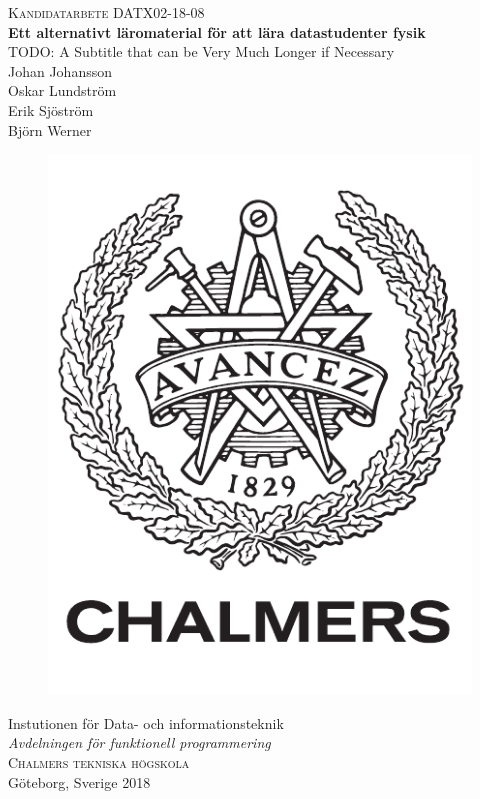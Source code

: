 \newpage
\restoregeometry
\thispagestyle{empty}
\mbox{}


\newpage
\thispagestyle{empty}
\begin{center}
	\textsc{\large Kandidatarbete DATX02-18-08}\\[4cm]		%
	\textbf{\Large Ett alternativt läromaterial för att lära datastudenter fysik} \\[1cm]
	{\large TODO: A Subtitle that can be Very Much Longer if Necessary}\\[1cm]
	{\large Johan Johansson}\\
  {\large Oskar Lundström}\\
 	{\large Erik Sjöström}\\
  {\large Björn Werner}\\

	\vfill
	\begin{figure}[H]
	\centering
	\includegraphics[width=0.2\pdfpagewidth]{figure/auxiliary/logo_swe.pdf} \\
	\end{figure}	\vspace{5mm}

	Instutionen för Data- och informationsteknik \\
	\emph{Avdelningen för funktionell programmering}\\
	\textsc{Chalmers tekniska högskola} \\
	Göteborg, Sverige 2018 \\
\end{center}


